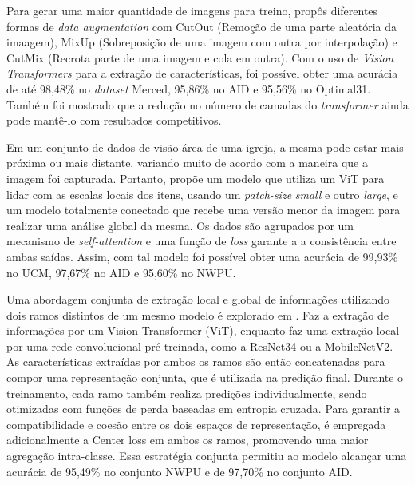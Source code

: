 \documentclass[conference]{IEEEtran}
\begin{document}
    Para gerar uma maior quantidade de imagens para treino, \cite{b2} propôs diferentes formas de \textit{data augmentation} com CutOut (Remoção de uma parte aleatória da imaagem), MixUp (Sobreposição de uma imagem com outra por interpolação) e CutMix (Recrota parte de uma imagem e cola em outra). Com o uso de \textit{Vision Transformers} para a extração de características, foi possível obter uma acurácia de até 98,48\% no \textit{dataset} Merced, 95,86\% no AID e 95,56\% no Optimal31. Também foi mostrado que a redução no número de camadas do \textit{transformer} ainda pode mantê-lo com resultados competitivos.

    Em um conjunto de dados de visão área de uma igreja, a mesma pode estar mais próxima ou mais distante, variando muito de acordo com a maneira que a imagem foi capturada. Portanto, \cite{b1} propõe um modelo que utiliza um ViT para lidar com as escalas locais dos itens, usando um \textit{patch-size} \textit{small} e outro \textit{large}, e um modelo totalmente conectado que recebe uma versão menor da imagem para realizar uma análise global da mesma. Os dados são agrupados por um mecanismo de \textit{self-attention} e uma função de \textit{loss} garante a a consistência entre ambas saídas. Assim, com tal modelo foi possível obter uma acurácia de 99,93\% no UCM, 97,67\% no AID e 95,60\% no NWPU.

    Uma abordagem conjunta de extração local e global de informações utilizando dois ramos distintos de um mesmo modelo é explorado em \cite{b0}. Faz a extração de informações por um  Vision Transformer (ViT), enquanto faz uma extração local por uma rede convolucional pré-treinada, como a ResNet34 ou a MobileNetV2. As características extraídas por ambos os ramos são então concatenadas para compor uma representação conjunta, que é utilizada na predição final. Durante o treinamento, cada ramo também realiza predições individualmente, sendo otimizadas com funções de perda baseadas em entropia cruzada. Para garantir a compatibilidade e coesão entre os dois espaços de representação, é empregada adicionalmente a Center loss em ambos os ramos, promovendo uma maior agregação intra-classe. Essa estratégia conjunta permitiu ao modelo alcançar uma acurácia de 95,49\% no conjunto NWPU e de 97,70\% no conjunto AID.
\end{document}
